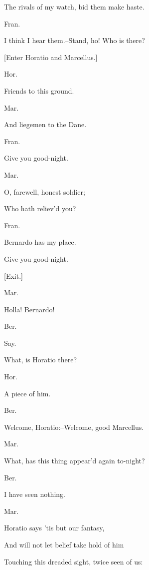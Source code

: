 \documentclass[12pt]{book}
\begin{document}
The rivals of my watch, bid them make haste.



Fran.

I think I hear them.--Stand, ho! Who is there?



[Enter Horatio and Marcellus.]



Hor.

Friends to this ground.



Mar.

And liegemen to the Dane.



Fran.

Give you good-night.



Mar.

O, farewell, honest soldier;

Who hath reliev'd you?



Fran.

Bernardo has my place.

Give you good-night.



[Exit.]



Mar.

Holla! Bernardo!



Ber.

Say.

What, is Horatio there?



Hor.

A piece of him.



Ber.

Welcome, Horatio:--Welcome, good Marcellus.



Mar.

What, has this thing appear'd again to-night?



Ber.

I have seen nothing.



Mar.

Horatio says 'tis but our fantasy,

And will not let belief take hold of him

Touching this dreaded sight, twice seen of us:
\end{document}
